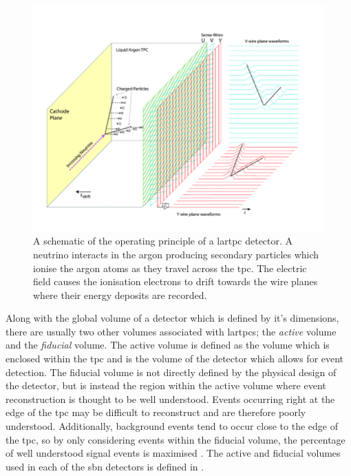 \begin{figure}[h]
    \centering
    \includegraphics[width =\largefigwidth]{figures-chap3/Operational-principle-of-the-MicroBooNE-LArTPC.png}
    \caption[Schematic of LArTPC detector.]{A schematic of the operating principle of a \gls{lartpc} detector. A neutrino interacts in the argon producing secondary particles which ionise the argon atoms as they travel across the \gls{tpc}. The electric field causes the ionisation electrons to drift towards the wire planes where their energy deposits are recorded. \cite{Design_and_Construction_of_the_MicroBooNE_Detector}}
    \label{fig:lartpc}
\end{figure}

Along with the global volume of a detector which is defined by it's dimensions, there are usually two other volumes associated with \glspl{lartpc}; the \textit{active} volume and the \textit{fiducial} volume. The active volume is defined as the volume which is enclosed within the \gls{tpc} and is the volume of the detector which allows for event detection. The fiducial volume is not directly defined by the physical design of the detector, but is instead the region within the active volume where event reconstruction is thought to be well understood. Events occurring right at the edge of the \gls{tpc} may be difficult to reconstruct and are therefore poorly understood. Additionally, background events tend to occur close to the edge of the \gls{tpc}, so by only considering events within the fiducial volume, the percentage of well understood signal events is maximised \cite{PDG_2022}. The active and fiducial volumes used in each of the \gls{sbn} detectors is defined in .

